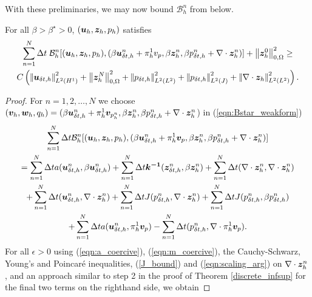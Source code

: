 With these preliminaries, we may now bound $\mathcal{B}_{h}^{n}$ from below.
\begin{lemma}
\label{lemma_bstar}
For all  $\beta > \beta^{\star} > 0$,   $(\boldsymbol{u}_{h},\boldsymbol{z}_{h},p_h)$ satisfies
\begin{multline*}
  \sum_{n=1}^{N} \Delta t \; \mathcal{B}_{h}^{n}[(\boldsymbol{u}_{h},\boldsymbol{z}_{h},p_h), ( \beta {\boldsymbol{u}_{\delta t,h}^{n}} + \pi_{h}^{1} v_{p} ,  \beta \boldsymbol{z}_{h}^{n}, \beta{{p}_{\delta t,h}^{n}}    + \nabla \cdot \boldsymbol{z}_{h}^{n} )] + {\left\vert\kern-0.25ex\left\vert \boldsymbol{z}_{h}^{0} \right\vert\kern-0.25ex\right\vert}_{0,\Omega}^{2} \geq \\ C\left( {\left\vert\kern-0.25ex\left\vert {\boldsymbol{u}_{\delta t,h}} \right\vert\kern-0.25ex\right\vert}_{L^{2}(H^{1})}^{2}+ {\left\vert\kern-0.25ex\left\vert \boldsymbol{z}_{h}^{N} \right\vert\kern-0.25ex\right\vert}_{0,\Omega}^{2}+ {\left\vert\kern-0.25ex\left\vert  {{p}_{\delta t,h}} \right\vert\kern-0.25ex\right\vert}_{L^{2}(L^{2})}^{2}+ {\left\vert\kern-0.25ex\left\vert  {{p}_{\delta t,h}} \right\vert\kern-0.25ex\right\vert}_{L^{2}(J)}^{2} +{\left\vert\kern-0.25ex\left\vert \nabla \cdot \boldsymbol{z}_{h} \right\vert\kern-0.25ex\right\vert}_{L^{2}(L^{2})}^{2}  \right).
\end{multline*}
\end{lemma}
\begin{proof}

For $n = 1,2, \ldots , N$ we choose $(\boldsymbol{v}_{h},\boldsymbol{w}_{h},{q}_{h}) = (\beta {\boldsymbol{u}_{\delta t,h}^{n}} + \pi_{h}^{1} \boldsymbol{v}_{p_h^n},   \beta \boldsymbol{z}_{h}^{n},   \beta {{p}_{\delta t,h}^{n}} + \nabla \cdot \boldsymbol{z}_{h}^{n} $) in (\ref{eqn:Bstar_weakform})
\begin{multline}
\sum_{n=1}^{N} \Delta t  \mathcal{B}_{h}^{n}[(\boldsymbol{u}_{h},\boldsymbol{z}_{h},p_h), ( \beta {\boldsymbol{u}_{\delta t,h}^{n}} + \pi_{h}^{1} \boldsymbol{v}_{p}  ,  \beta \boldsymbol{z}_{h}^{n}, \beta{{p}_{\delta t,h}^{n}}   + \nabla \cdot \boldsymbol{z}_{h}^{n}  )] \\
=\sum^{N}_{n=1} \Delta t a({\boldsymbol{u}_{\delta t,h}^{n}},\beta {\boldsymbol{u}_{\delta t,h}^{n}})
+ \sum^{N}_{n=1} \Delta t \boldsymbol{k^{-1}}({\boldsymbol{z}_{\delta t,h}^{n}},  \beta\boldsymbol{z}_{h}^{n})
+ \sum^{N}_{n=1} \Delta t (\nabla \cdot \boldsymbol{z}_{h}^{n}, \nabla \cdot \boldsymbol{z}_{h}^{n}) \\
+ \sum^{N}_{n=1} \Delta t( {\boldsymbol{u}_{\delta t,h}^{n}} , \nabla \cdot \boldsymbol{z}_{h}^{n})
+ \sum^{N}_{n=1} \Delta tJ( {{p}_{\delta t,h}^{n}} ,\nabla \cdot \boldsymbol{z}_{h}^{n} )
+ \sum^{N}_{n=1} \Delta tJ( {{p}_{\delta t,h}^{n}} , \beta{{p}_{\delta t,h}^{n}}) \\
+ \sum^{N}_{n=1} \Delta t a({\boldsymbol{u}_{\delta t,h}^{n}},\pi_{h}^{1} \boldsymbol{v}_{p})
- \sum^{N}_{n=1} \Delta t ({{p}_{\delta t,h}^{n}},\nabla \cdot \pi_{h}^{1} \boldsymbol{v}_{p}).
\label{eqn:sum_Bstar}
\end{multline}
For all $\epsilon > 0$ using  (\ref{eqn:a_coercive}), (\ref{eqn:m_coercive}), the Cauchy-Schwarz, Young's and  Poincar\'{e} inequalities, (\ref{J_bound}) and (\ref{eqn:scaling_arg}) on $ \nabla \cdot \boldsymbol{z}_{h}^{n}$, and an approach similar to step 2 in the proof of Theorem \ref{discrete_infsup} for the final two terms on the righthand side, we obtain


\end{proof}
